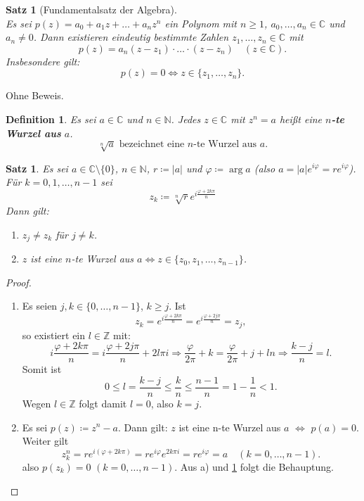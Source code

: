 \documentclass[12pt]{extreport} %
\newcommand{\C}{\mathbb{C}}
\newcommand{\N}{\mathbb{N}}
\newcommand{\Z}{\mathbb{Z}}
\theoremstyle{named}
\theoremstyle{itshape}
\newtheorem{satz}[unnamedtheorem]{Satz}
\newtheorem*{definition}{Definition}
\theoremstyle{normal}
\begin{document}
{ 
\begin{satz}[Fundamentalsatz der Algebra] \label{12.3:prop-FundamentalsatzDerAlgebra} ~\\
	Es sei $p(z) = a_{0} + a_{1} z + \dotsc + a_{n} z^{n}$ ein Polynom mit $n \geq 1$, $a_{0}, \dotsc, a_{n} \in \C$ und $a_{n} \neq 0$. 
	Dann existieren eindeutig bestimmte Zahlen $z_{1}, \dotsc, z_{n} \in \C$ mit 
	$$p(z) = a_{n} (z - z_{1}) \cdot \dotsc \cdot (z - z_{n}) \quad (z \in \C).$$
	Insbesondere gilt: 
	$$ p(z)=0 \iff z \in \{z_{1}, \dotsc, z_{n}\}.$$
\end{satz}

Ohne Beweis.

\begin{definition}
	Es sei $a \in \C$ und $n \in \N$. Jedes $z \in \C$ mit $z^{n} = a$ hei{\ss}t eine \textbf{$n$-te Wurzel aus} $a$.
	$$ \sqrt[n]{a} \text{  bezeichnet eine $n$-te Wurzel aus } a.$$
\end{definition}


\begin{satz} \label{12.4:satz}
	Es sei $a \in \C \setminus \{ 0 \}$, $n \in \N$, $r \coloneqq |a|$ und $\varphi \coloneqq \arg a$ (also $a = |a| e^{i \varphi} = r e^{i \varphi}$). 
	Für $k = 0, 1, \dotsc, n - 1$ sei
		$$ z_{k} \coloneqq \sqrt[n]{r} e^{i \frac{\varphi + 2 k \pi}{n}} $$
	Dann gilt:
	\begin{enumerate}
		\item $z_{j} \neq z_{k}$ für $j \neq k$.
		\item $z$ ist eine $n$-te Wurzel aus $a \iff z \in \{ z_{0}, z_{1}, \dotsc, z_{n-1} \}$.
	\end{enumerate}
\end{satz}

\begin{proof} ~\
	\begin{enumerate}
		\item Es seien $j, k \in \{0, \dotsc, n - 1 \}$, $k \geq j$. Ist 
		        $$z_k=e^{i \frac{\varphi + 2k \pi}{n}} = e^{i \frac{\varphi + 2 j \pi}{n}}=z_j, $$ so existiert ein $l \in \Z$ mit:
			$$ 
			i \frac{\varphi + 2k \pi}{n} = i \frac{\varphi + 2 j \pi}{n} + 2 l \pi i \Rightarrow \frac{\varphi}{2 \pi} + k = \frac{\varphi}{2 \pi} + j + l n 
			\Rightarrow \frac{k - j}{n} = l.
			$$
			Somit ist
			$$ 0 \le  l= \frac{k - j}{n}  \leq \frac{k}{n} \leq \frac{n - 1}{n} = 1 - \frac{1}{n} < 1. $$
			Wegen $l \in \Z$ folgt damit $l = 0$, also $k = j$.
		\item   Es sei $p(z) \coloneqq z^{n} - a$. Dann gilt: $z$ ist eine n-te Wurzel aus $a$ $\iff$ $p(a) = 0$. Weiter gilt
			$$ z_{k}^{n} = r e^{i(\varphi +2 k \pi)} = r e^{i \varphi} e^{2 k \pi i} = r e^{i \varphi} = a \quad (k = 0, \dotsc, n - 1). $$
			also $p(z_{k}) = 0$ $(k = 0, \dotsc, n - 1)$. Aus a) und \ref{12.3:prop-FundamentalsatzDerAlgebra} folgt die Behauptung.
	\end{enumerate}
\end{proof}

}
\end{document}
